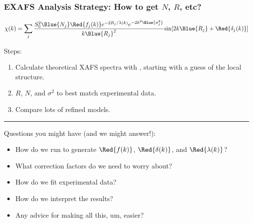 

\begin{frame}  \frametitle{EXAFS Analysis Strategy:  How to get $N$, $R$, etc?}

  \begin{cenpage}{99mm}

      \[
      \chi(k) = \sum_j {{ S_0^2 {\Blue{N_j}} {\Red{f_j(k)}}  e^{-2R_j/\lambda(k)}
          e^{-2k^2{\Blue{\sigma_j^2}}}}\over{k{\Blue{R_j}}^2}}
      {\sin[{2k{\Blue{R_j}} + {\Red{\delta_j(k)}}} ]}
      \]

   \vmm
   Steps:
   \begin{enumerate}
   \item Calculate theoretical XAFS spectra  with {\feff},  starting with a guess of the local structure.
   \item  {} $R$, $N$, and $\sigma^2$  to best match  experimental data.
   \item Compare lots of refined models.
   \end{enumerate}

\vmm \vmm \hrule \vmm\vmm

 Questions you might have (and we might answer!):

  \begin{itemize}
  \item How do we run {\feff} to generate $\Red{f(k)}$, $\Red{\delta(k)}$,
    and  $\Red{\lambda(k)}$?
  \item What correction factors do we need to worry about?
  \item How do we fit experimental data?
  \item How do we interpret the results?
  \item Any advice for making all this, um, easier?
  \end{itemize}

\vfill
   \end{cenpage}

\end{frame}
